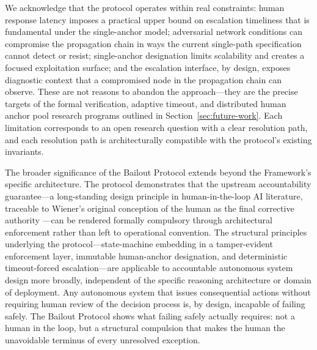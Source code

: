We acknowledge that the protocol operates within real constraints: human response latency imposes a practical upper bound on escalation timeliness that is fundamental under the single-anchor model; adversarial network conditions can compromise the propagation chain in ways the current single-path specification cannot detect or resist; single-anchor designation limits scalability and creates a focused exploitation surface; and the escalation interface, by design, exposes diagnostic context that a compromised node in the propagation chain can observe. These are not reasons to abandon the approach---they are the precise targets of the formal verification, adaptive timeout, and distributed human anchor pool research programs outlined in Section~\ref{sec:future-work}. Each limitation corresponds to an open research question with a clear resolution path, and each resolution path is architecturally compatible with the protocol's existing invariants.

The broader significance of the Bailout Protocol extends beyond the \bxthree{} Framework's specific architecture. The protocol demonstrates that the upstream accountability guarantee---a long-standing design principle in human-in-the-loop AI literature, traceable to Wiener's original conception of the human as the final corrective authority \cite{wiener1954human}---can be rendered formally compulsory through architectural enforcement rather than left to operational convention. The structural principles underlying the protocol---state-machine embedding in a tamper-evident enforcement layer, immutable human-anchor designation, and deterministic timeout-forced escalation---are applicable to accountable autonomous system design more broadly, independent of the specific reasoning architecture or domain of deployment. Any autonomous system that issues consequential actions without requiring human review of the decision process is, by design, incapable of failing safely. The Bailout Protocol shows what failing safely actually requires: not a human in the loop, but a structural compulsion that makes the human the unavoidable terminus of every unresolved exception.
